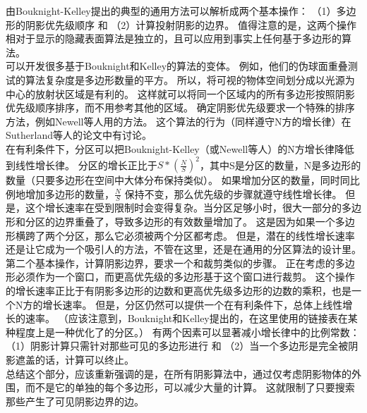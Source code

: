 由Bouknight-Kelley提出的典型的通用方法可以解析成两个基本操作：
（1）多边形的阴影优先级顺序 和
（2）计算投射阴影的边界。
值得注意的是，这两个操作相对于显示的隐藏表面算法是独立的，且可以应用到事实上任何基于多边形的算法。\\
可以开发很多基于Bouknight和Kelley的算法的变体。
例如，他们的伪球面重叠测试的算法复杂度是多边形数量的平方。
所以，将可视的物体空间划分成以光源为中心的放射状区域是有利的。
这样就可以将同一个区域内的所有多边形按照阴影优先级顺序排序，而不用参考其他的区域。
确定阴影优先级要求一个特殊的排序方法，例如Newell等人用的方法\cite{9}。
这个算法的行为（同样遵守N方的增长律）在Sutherland等人的论文中有讨论\cite{12}。\\
在有利条件下，分区可以把Bouknight-Kelley（或Newell等人）的N方增长律降低到线性增长律。
分区的增长正比于$ S * (\frac{N}{S})^{2} $，其中S是分区的数量，N是多边形的数量（只要多边形在空间中大体分布保持类似）。
如果增加分区的数量，同时同比例地增加多边形的数量，$ \frac{N}{S} $ 保持不变，那么优先级的步骤就遵守线性增长律。
但是，这个增长速率在受到限制时会变得复杂。当分区足够小时，很大一部分的多边形和分区的边界重叠了，导致多边形的有效数量增加了。
这是因为如果一个多边形横跨了两个分区，那么它必须被两个分区都考虑。
但是，潜在的线性增长速率还是让它成为一个吸引人的方法，不管在这里，还是在通用的分区算法的设计里。\\
第二个基本操作，计算阴影边界，要求一个和裁剪类似的步骤。
正在考虑的多边形必须作为一个窗口，而更高优先级的多边形基于这个窗口进行裁剪。
这个操作的增长速率正比于有阴影多边形的边数和更高优先级多边形的边数的乘积，也是一个N方的增长速率。
但是，分区仍然可以提供一个在有利条件下，总体上线性增长的速率。
（应该注意到，Bouknight和Kelley提出的，在这里使用的链接表在某种程度上是一种优化了的分区。）
有两个因素可以显著减小增长律中的比例常数：
（1）阴影计算只需针对那些可见的多边形进行 和
（2）当一个多边形是完全被阴影遮盖的话，计算可以终止。\\
总结这个部分，应该重新强调的是，在所有阴影算法中，通过仅考虑阴影物体的外围，而不是它的单独的每个多边形，可以减少大量的计算。
这就限制了只要搜索那些产生了可见阴影边界的边。